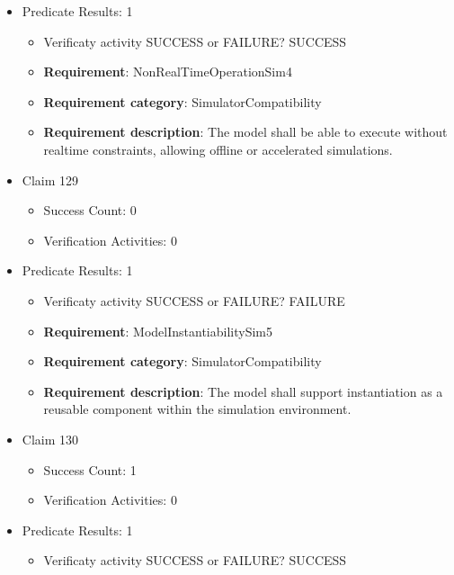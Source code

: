 \documentclass{article}
\begin{document}
\begin{itemize}
									    
				\item Predicate Results: 1
					\begin{itemize}				
					\item Verificaty activity SUCCESS or FAILURE? SUCCESS
					
					\item \textbf{Requirement}: NonRealTimeOperationSim4 
					\item \textbf{Requirement category}: SimulatorCompatibility
					\item \textbf{Requirement description}: The model shall be able to execute without realtime constraints, allowing offline or accelerated simulations.
					\end{itemize}

  				  \item Claim 129
				\begin{itemize}
			    	\item Success Count: 0 
			    	\item Verification Activities: 0
				\end{itemize}
				
									    
				\item Predicate Results: 1
					\begin{itemize}				
					\item Verificaty activity SUCCESS or FAILURE? FAILURE
					
					\item \textbf{Requirement}: ModelInstantiabilitySim5 
					\item \textbf{Requirement category}: SimulatorCompatibility
					\item \textbf{Requirement description}: The model shall support instantiation as a reusable component within the simulation environment.
					\end{itemize}

  				  \item Claim 130
				\begin{itemize}
			    	\item Success Count: 1 
			    	\item Verification Activities: 0
				\end{itemize}
				
									    
				\item Predicate Results: 1
					\begin{itemize}				
					\item Verificaty activity SUCCESS or FAILURE? SUCCESS
					

\end{itemize}
\end{itemize}
\end{document}
